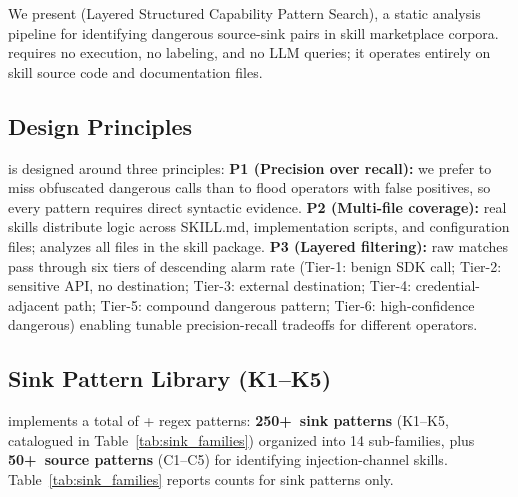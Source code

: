 
We present \lscps (Layered Structured Capability Pattern Search),
a static analysis pipeline for identifying dangerous source-sink pairs
in skill marketplace corpora.
\lscps requires no execution, no labeling, and no LLM queries;
it operates entirely on skill source code and documentation files.

\subsection{Design Principles}

\lscps is designed around three principles:
\textbf{P1 (Precision over recall):}
we prefer to miss obfuscated dangerous calls than to flood operators
with false positives, so every pattern requires direct syntactic evidence.
\textbf{P2 (Multi-file coverage):}
real skills distribute logic across SKILL.md, implementation scripts,
and configuration files; \lscps analyzes all files in the skill package.
\textbf{P3 (Layered filtering):}
raw matches pass through six tiers of descending alarm rate
(Tier-1: benign SDK call; Tier-2: sensitive API, no destination;
Tier-3: external destination; Tier-4: credential-adjacent path;
Tier-5: compound dangerous pattern; Tier-6: high-confidence dangerous)
enabling tunable precision-recall tradeoffs for different operators.

\subsection{Sink Pattern Library (K1--K5)}
\label{sec:sink_patterns}

\lscps implements a total of \NpatternsLSCPS{}+ regex patterns:
\textbf{250+\ sink patterns} (K1--K5, catalogued in Table~\ref{tab:sink_families})
organized into 14 sub-families, plus \textbf{50+\ source patterns} (C1--C5)
for identifying injection-channel skills.
Table~\ref{tab:sink_families} reports counts for sink patterns only.

